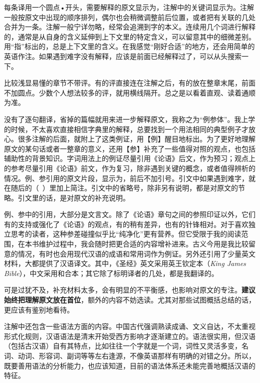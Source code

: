 每条译用一个圆点•开头，需要解释的原文显示为，注解中的关键词显示为。注解一般按原文中出现的顺序排列，偶尔也会稍微调整前后位置，或者把有关联的几处合并为一条。注解一般宁详勿略，经常会追溯到字的本义。连续用几个词进行解释的，通常是从自身的含义延伸到上下文里的特定含义，可以留意其中的细微差别。用“指”标出的，总是上下文里的含义。在我感觉“刚好合适”的地方，还会用简单的英语作注。如果遇到难字没有解释，应该是前面已经解释过了，可以从头搜索一下。

比较浅显易懂的章节不带评。有的评直接连在注解之后，有的放在整章末尾，前面不加圆点。少数个人想法较多的评，就用横线隔开。总之是以看着直观、读着通顺为准。

没有了逐句翻译，省掉的篇幅就用来进一步解释原文，我称之为“例参体”。我上学的时候，不太喜欢直接相信字典里的解释，总要找到一个用法相同的典型例子才放心。很多注解的后面，就附上了这类例证，用【例】醒目地标出。为了更好地理解原文的某句话或者一整章的意义，还用【参】补充了一些值得对照的观点，也包括辅助性的背景知识。字词用法上的例证尽量引用《论语》后文，作为预习；观点上的参考尽量引用《论语》前文，作为复习，除非遇到关键的概念，或者值得辨析的情况。例、参引用的原文片段，显示为，前后不加引号。引文中如果遇到难字，就在随后的（~）里加上简注。引文中的省略号，除非另有说明，都是对原文的节略。引文里的话，是对原文的补充说明。

例、参中的引用，大部分是文言文。除了《论语》章句之间的参照印证以外，它们有的支持或强化了《论语》的观点，有的稍有差异，也有的针锋相对。对于喜欢独立思考的读者，这种参差碰撞似乎比“纯净化”更有营养。但它受限于我的阅读范围，在本书维护过程中，我会随时把更合适的内容增补进来。古义今用是我比较留意的情况，有时也会用现代汉语的成语和常用词作为例证。另外还引用了少量英文材料，大都提供了汉语译文。其中，《圣经》英文采用英王钦定本（\emph{King James Bible}），中文采用和合本；其它除了标明译者的几处，都是我翻译的。

可是过犹不及，补充材料太多，会有明显的不平衡感，也影响对原文的专注。\textbf{建议始终把理解原文放在首位}，额外的内容不妨选读。尤其对那些试图概括总结的话，更应该有鉴别地看待。

注解中还包含一些语法方面的内容。中国古代强调熟读成诵、文义自达，不太重视形式化规则，汉语语法是清末开始受西方影响才逐渐建立的。语法很实用，但汉语（包括古汉语）自有其特点，比如往往一个字就是一个词，词性又灵活多变，名词、动词、形容词、副词等等左右逢源，不像英语那样有明确的对错之分。所以，既要善用语法的分析能力，也应该知道，目前的语法体系还未能完善地概括汉语的特征。

